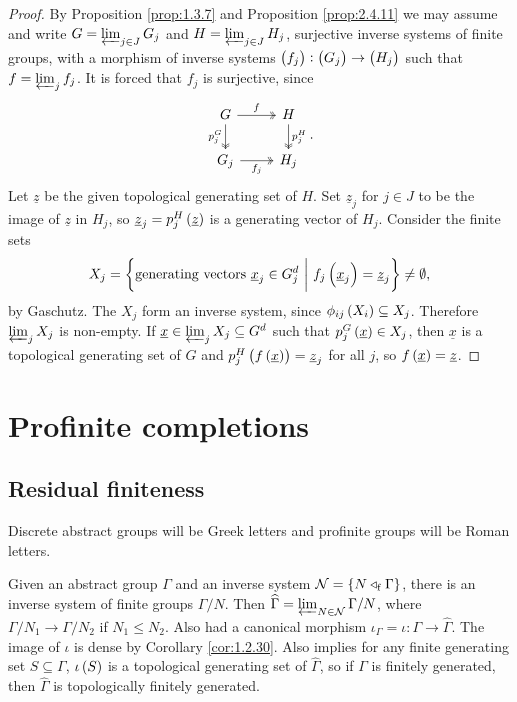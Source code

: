 \begin{proof}
By Proposition \ref{prop:1.3.7} and Proposition \ref{prop:2.4.11} we may assume and write $ G = \varprojlim_{j \in J} G_j $ and $ H = \varprojlim_{j \in J} H_j $, surjective inverse systems of finite groups, with a morphism of inverse systems $ \br{f_j} : \br{G_j} \to \br{H_j} $ such that $ f = \varprojlim_j f_j $. It is forced that $ f_j $ is surjective, since
$$
\begin{tikzcd}
G \arrow[twoheadrightarrow]{r}{f} \arrow[twoheadrightarrow]{d}[swap]{p_j^G} & H \arrow[twoheadrightarrow]{d}{p_j^H} \\
G_j \arrow[twoheadrightarrow]{r}[swap]{f_j} & H_j
\end{tikzcd}.
$$
Let $ \underline{z} $ be the given topological generating set of $ H $. Set $ \underline{z}_j $ for $ j \in J $ to be the image of $ \underline{z} $ in $ H_j $, so $ \underline{z}_j = p_j^H\br{\underline{z}} $ is a generating vector of $ H_j $. Consider the finite sets
$$ X_j = \cbr{\text{generating vectors} \ \underline{x}_j \in G_j^d \st f_j\br{\underline{x}_j} = \underline{z}_j} \ne \emptyset, $$
by Gaschutz. The $ X_j $ form an inverse system, since $ \phi_{ij}\br{X_i} \subseteq X_j $. Therefore $ \varprojlim_j X_j $ is non-empty. If $ \underline{x} \in \varprojlim_j X_j \subseteq G^d $ such that $ p_j^G\br{\underline{x}} \in X_j $, then $ \underline{x} $ is a topological generating set of $ G $ and $ p_j^H\br{f\br{\underline{x}}} = \underline{z}_j $ for all $ j $, so $ f\br{\underline{x}} = \underline{z} $.
\end{proof}

\pagebreak

\section{Profinite completions}

\subsection{Residual finiteness}

\begin{notation}
Discrete abstract groups will be Greek letters and profinite groups will be Roman letters.
\end{notation}

Given an abstract group $ \Gamma $ and an inverse system $ \NNN = \cbr{N \triangleleft_\f \Gamma} $, there is an inverse system of finite groups $ \Gamma / N $. Then $ \widehat{\Gamma} = \varprojlim_{N \in \mathcal{N}} \Gamma / N $, where $ \Gamma / N_1 \to \Gamma / N_2 $ if $ N_1 \le N_2 $. Also had a canonical morphism $ \iota_\Gamma = \iota : \Gamma \to \widehat{\Gamma} $. The image of $ \iota $ is dense by Corollary \ref{cor:1.2.30}. Also implies for any finite generating set $ S \subseteq \Gamma $, $ \iota\br{S} $ is a topological generating set of $ \widehat{\Gamma} $, so if $ \Gamma $ is finitely generated, then $ \widehat{\Gamma} $ is topologically finitely generated.

